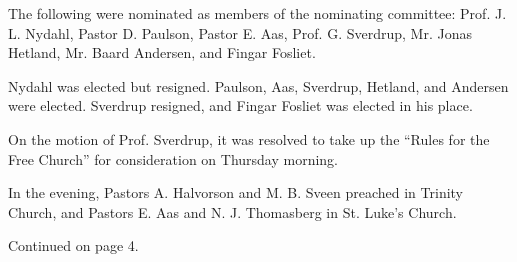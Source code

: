 The following were nominated as members of the nominating committee: Prof. J. L. Nydahl, Pastor D. Paulson, Pastor E. Aas, Prof. G. Sverdrup, Mr. Jonas Hetland, Mr. Baard Andersen, and Fingar Fosliet.

Nydahl was elected but resigned. Paulson, Aas, Sverdrup, Hetland, and Andersen were elected. Sverdrup resigned, and Fingar Fosliet was elected in his place.

On the motion of Prof. Sverdrup, it was resolved to take up the “Rules for the Free Church” for consideration on Thursday morning.

In the evening, Pastors A. Halvorson and M. B. Sveen preached in Trinity Church, and Pastors E. Aas and N. J. Thomasberg in St. Luke’s Church.

Continued on page 4. 
